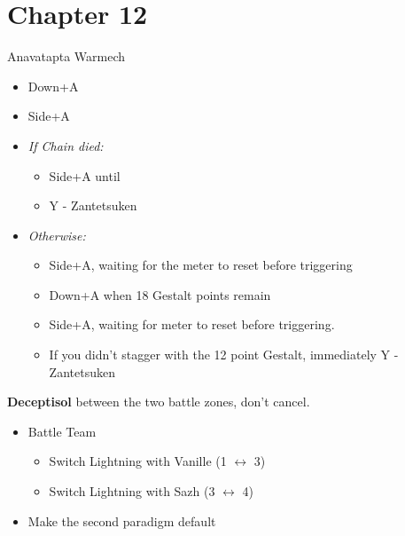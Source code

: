 \chapter{Chapter 12}
\begin{battle}[0:27]{Anavatapta Warmech}
	\begin{itemize}
		\item Down+A
		\item Side+A
		\item \textit{If Chain died:}
		      \begin{itemize}
			      \item Side+A until \stagger
			      \item Y - Zantetsuken
		      \end{itemize}
		\item \textit{Otherwise:}
		      \begin{itemize}
			      \item Side+A, waiting for the meter to reset before triggering
			      \item Down+A when 18 Gestalt points remain
			      \item Side+A, waiting for meter to reset before triggering.
			      \item If you didn't stagger with the 12 point Gestalt, immediately Y - Zantetsuken
		      \end{itemize}
	\end{itemize}
\end{battle}


\textbf{Deceptisol} between the two battle zones, don't cancel.

\begin{menu}
	\begin{itemize}
		\paradigm
		\begin{itemize}
			\item Battle Team
			      \begin{itemize}
				      \item Switch Lightning with Vanille (1 $\leftrightarrow$ 3)
				      \item Switch Lightning with Sazh (3 $\leftrightarrow$ 4)
			      \end{itemize}
			\item Make the second paradigm default
		\end{itemize}
	\end{itemize}
\end{menu}

